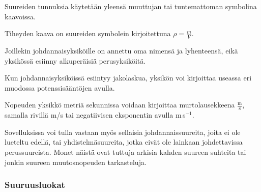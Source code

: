 Suureiden tunnuksia käytetään yleensä muuttujan tai tuntemattoman symbolina kaavoissa.

\begin{esimerkki}
Tiheyden kaava on suureiden symbolein kirjoitettuna $\rho=\frac{m}{V}$.
\end{esimerkki}

Joillekin johdannaisyksiköille on annettu oma nimensä ja lyhenteensä, eikä yksikössä esiinny alkuperäisiä perusyksiköitä. 

\begin{esimerkki}
\end{esimerkki}

Kun johdannaisyksiköissä esiintyy jakolaskua, yksikön voi kirjoittaa useassa eri muodossa potenssisääntöjen avulla.

\begin{esimerkki}
Nopeuden yksikkö metriä sekunnissa voidaan kirjoittaa murtolausekkeena $\frac{\text{m}}{\text{s}}$, samalla rivillä m/s tai negatiivisen eksponentin avulla m\,s$^{-1}$.
\end{esimerkki}

Sovelluksissa voi tulla vastaan myös sellaisia johdannaissuureita, joita ei ole lueteltu edellä, tai yhdistelmäsuureita, jotka eivät ole lainkaan johdettavissa perussuureista. Monet näistä ovat tuttuja arkisia kahden suureen suhteita tai jonkin suureen muutosnopeuden tarkasteluja.

\begin{esimerkki}
\end{esimerkki}

\subsubsection{Suuruusluokat}

